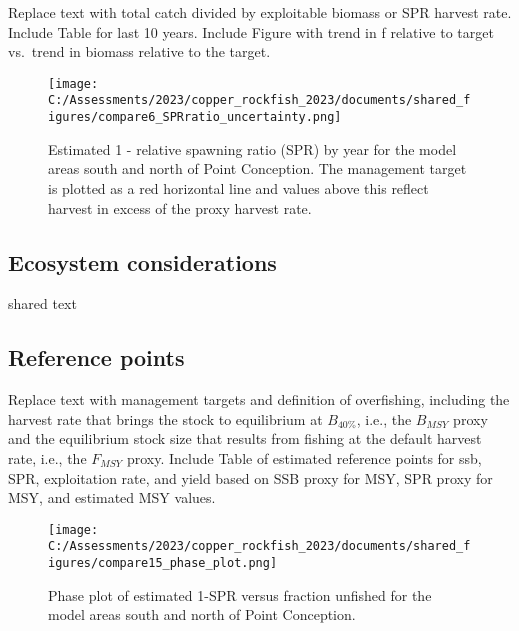 \documentclass[11pt,
  english,
  letterpaper,
]{article}
\begin{document}
Replace text with total catch divided by exploitable biomass or SPR harvest rate. Include Table for last 10 years. Include Figure with trend in f relative to target vs.~trend in biomass relative to the target.





\begin{figure}
\centering
\texttt{[image: C:/Assessments/2023/copper\_rockfish\_2023/documents/shared\_figures/compare6\_SPRratio\_uncertainty.png]}
\caption{Estimated 1 - relative spawning ratio (SPR) by year for the model areas south and north of Point Conception. The management target is plotted as a red horizontal line and values above this reflect harvest in excess of the proxy harvest rate.\label{fig:es-1-spr}}
\end{figure}

\hypertarget{ecosystem-considerations}{%
\subsection*{Ecosystem considerations}\label{ecosystem-considerations}}

shared text

\hypertarget{reference-points}{%
\subsection*{Reference points}\label{reference-points}}

Replace text with management targets and definition of overfishing, including the harvest rate that brings the stock to equilibrium at \(B_{40\%}\), i.e., the \(B_{MSY}\) proxy and the equilibrium stock size that results from fishing at the default harvest rate, i.e., the \(F_{MSY}\) proxy. Include Table of estimated reference points for ssb, SPR, exploitation rate, and yield based on SSB proxy for MSY, SPR proxy for MSY, and estimated MSY values.





\begin{figure}
\centering
\texttt{[image: C:/Assessments/2023/copper\_rockfish\_2023/documents/shared\_figures/compare15\_phase\_plot.png]}
\caption{Phase plot of estimated 1-SPR versus fraction unfished for the model areas south and north of Point Conception.\label{fig:es-phase}}
\end{figure}
\end{document}
